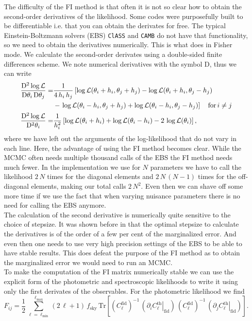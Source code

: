 \documentclass[../main.tex]{subfiles}
\begin{document}
The difficulty of the FI method is that often it is not so clear how to obtain the second-order derivatives of the likelihood. Some codes were purposefully built to be differentiable i.e. that you can obtain the derivates for free. The typical Einstein-Boltzmann solvers (EBS) {\tt ClASS}\cite{Blas:2011rf} and {\tt CAMB}\cite{Lewis:1999bs} do not have that functionality, so we need to obtain the derivatives numerically. This is what \montepython does in Fisher mode. We calculate the second-order derivates using a double-sided finite differences scheme. We note numerical derivatives with the symbol D, thus we can write 
\begin{align}
    \frac{\mathrm{D}^2 \log\mathcal{L}}{\mathrm{D} \theta_i \, \mathrm{D} \theta_j} =& \frac{1}{4\,h_i\,h_j}\left[\log\mathcal{L}(\theta_i+h_i,\theta_j+h_j)-\log\mathcal{L}(\theta_i+h_i,\theta_j-h_j)\right. \nonumber\\
&-\left.\log\mathcal{L}(\theta_i-h_i,\theta_j+h_j)+\log\mathcal{L}(\theta_i-h_i,\theta_j-h_j)\right]\quad \text{for}\,i\neq j\\
    \frac{\mathrm{D}^2 \log\mathcal{L}}{\mathrm{D}^2 \theta_i} =&  \frac{1}{h_i^2} \left[\log\mathcal{L}(\theta_i+h_i)+\log\mathcal{L}(\theta_i-h_i)-2\,\log\mathcal{L}(\theta_i)\right],
\end{align}
where we have left out the arguments of the log-likelihood that do not vary in each line. Here, the advantage of using the FI method becomes clear. While the MCMC often needs multiple thousand calls of the EBS the FI method needs much fewer. In the implementation we use for $N$ parameters we have to call the likelihood $2\, N$ times for the diagonal elements and $2\, N\,(N-1)$ times for the off-diagonal elements, making our total calls $2\, N^2$. Even then we can shave off some more time if we use the fact that when varying nuisance parameters there is no need for calling the EBS anymore.\\
The calculation of the second derivative is numerically quite sensitive to the choice of stepsize. It was shown before in \cite{casas2023euclid} that the optimal stepsize to calculate the derivatives is of the order of a few per cent of the marginalized error. And even then one needs to use very high precision settings of the EBS to be able to have stable results. This does defeat the purpose of the FI method as to obtain the marginalized error we would need to run an MCMC.\\
To make the computation of the FI matrix numerically stable we can use the explicit form of the photometric and spectroscopic likelihoods to write it using only the first derivates of the observables. For the photometric likelihood we find \begin{equation}
    F_{ij} = \frac{1}{2}\,\sum_{\ell=\ell_\mathrm{min}}^{\ell_\mathrm{max}} (2\,\ell+1)\,f_\mathrm{sky}\,\mathrm{Tr}\left[\left(C_\ell^\mathrm{fid}\right)^{-1}\,\left(\left.\partial_i C^\mathrm{th}_\ell\right|_\mathrm{fid}\right)\,\left(C_\ell^\mathrm{fid}\right)^{-1}\,\left(\left.\partial_j C^\mathrm{th}_\ell\right|_\mathrm{fid}\right)\right].
\end{equation}
\end{document}
